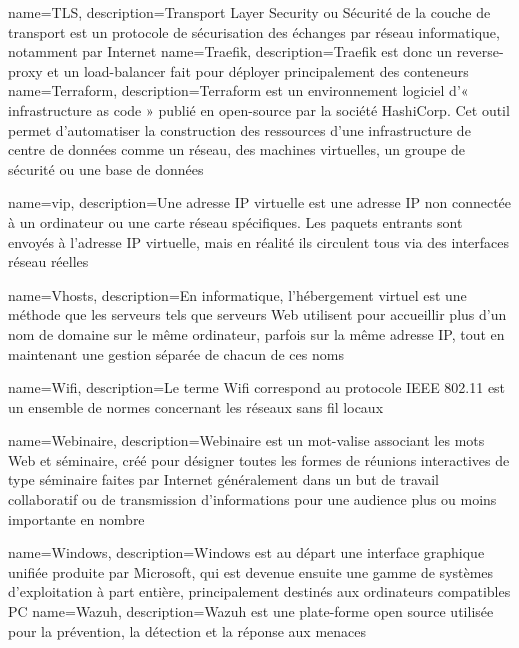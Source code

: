 {
    name=TLS,
    description={Transport Layer Security ou Sécurité de la couche de transport est un protocole de sécurisation des échanges par réseau informatique, notamment par Internet}
}
{
    name=Traefik,
    description={Traefik est donc un reverse-proxy et un load-balancer fait pour déployer principalement des conteneurs}
}
{
    name=Terraform,
    description={Terraform est un environnement logiciel d'« infrastructure as code » publié en open-source par la société HashiCorp. Cet outil permet d'automatiser la construction des ressources d'une infrastructure de centre de données comme un réseau, des machines virtuelles, un groupe de sécurité ou une base de données}
}


{
    name=vip,
    description={Une adresse IP virtuelle est une adresse IP non connectée à un ordinateur ou une carte réseau spécifiques. Les paquets entrants sont envoyés à l'adresse IP virtuelle, mais en réalité ils circulent tous via des interfaces réseau réelles}
}

{
    name=Vhosts,
    description={En informatique, l'hébergement virtuel est une méthode que les serveurs tels que serveurs Web utilisent pour accueillir plus d'un nom de domaine sur le même ordinateur, parfois sur la même adresse IP, tout en maintenant une gestion séparée de chacun de ces noms}
}

{
    name=Wifi,
    description={Le terme Wifi correspond au protocole IEEE 802.11 est un ensemble de normes concernant les réseaux sans fil locaux}
}

{
    name=Webinaire,
    description={Webinaire est un mot-valise associant les mots Web et séminaire, créé pour désigner toutes les formes de réunions interactives de type séminaire faites par Internet généralement dans un but de travail collaboratif ou de transmission d'informations pour une audience plus ou moins importante en nombre}
}


{
    name=Windows,
    description={Windows est au départ une interface graphique unifiée produite par Microsoft, qui est devenue ensuite une gamme de systèmes d’exploitation à part entière, principalement destinés aux ordinateurs compatibles PC}
}
{
    name=Wazuh,
    description={Wazuh est une plate-forme open source utilisée pour la prévention, la détection et la réponse aux menaces}
}

